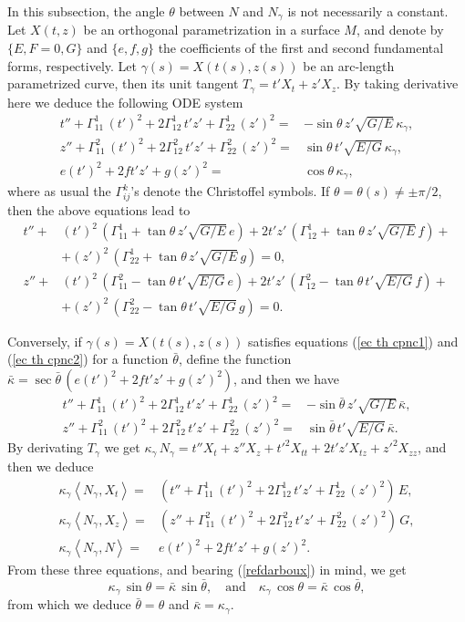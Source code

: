 \documentclass[11pt,a4paper]{article}
\def\<{\left<}
\def\>{\right>}
\def\g{\gamma}
\begin{document}
In this subsection, the angle $\theta$ between $N$ and $N_\g$ is not necessarily a constant. Let $X(t,z)$ be an orthogonal parametrization in a surface $M$, and denote by $\{E,F=0,G\}$ and $\{e,f,g\}$ the coefficients of the first and second fundamental forms, respectively.
Let $\g(s)=X(t(s),z(s))$ be an arc-length parametrized curve, then its unit tangent $T_\g=t'X_t+z'X_z$.
By taking derivative here we deduce the following ODE system
\begin{align*}
 t''+\Gamma_{11}^1\,(t')^2+2\Gamma_{12}^1\, t'z'+\Gamma_{22}^1\,(z')^2 = & -\sin\theta\,z'\sqrt{G/E}\,\kappa_\g, \\
 z''+\Gamma_{11}^2\,(t')^2+2\Gamma_{12}^2\, t'z'+\Gamma_{22}^2\,(z')^2 = & \sin\theta\,t'\sqrt{E/G}\,\kappa_\g,\\
 e(t')^2+2ft'z'+g(z')^2= & \cos\theta\,\kappa_\g,
\end{align*}
where as usual the $\Gamma_{ij}^k$'s denote the Christoffel symbols. If $\theta=\theta(s)\neq\pm\pi/2$, then the above equations lead to
\begin{align}
 t''+&(t')^2\,(\Gamma_{11}^1+\tan\theta\,z'\sqrt{G/E}\,e)+2 t'z'\,(\Gamma_{12}^1+\tan\theta\,z'\sqrt{G/E}\,f)+\nonumber\\
 &+(z')^2\,(\Gamma_{22}^1+\tan\theta\,z'\sqrt{G/E}\,g) =  0,\label{ec th cpnc1} \\
 z''+&(t')^2\,(\Gamma_{11}^2-\tan\theta\,t'\sqrt{E/G}\,e)+2 t'z'\,(\Gamma_{12}^2-\tan\theta\,t'\sqrt{E/G}\,f)+\nonumber\\
 &+(z')^2\,(\Gamma_{22}^2-\tan\theta\,t'\sqrt{E/G}\,g) = 0.\label{ec th cpnc2}
\end{align}

Conversely, if $\gamma(s)=X(t(s),z(s))$ satisfies equations (\ref{ec th cpnc1}) and (\ref{ec th cpnc2}) for a function $\bar{\theta}$, define the function $\bar{\kappa}=\sec\bar{\theta}\,(e(t')^2+2ft'z'+g(z')^2)$, and then we have
\begin{align*}
 t''+\Gamma_{11}^1\,(t')^2+2\Gamma_{12}^1\, t'z'+\Gamma_{22}^1\,(z')^2 = & -\sin\bar\theta\,z'\sqrt{G/E}\,\bar{\kappa},\\
 z''+\Gamma_{11}^2\,(t')^2+2\Gamma_{12}^2\, t'z'+\Gamma_{22}^2\,(z')^2 = & \sin\bar\theta\,t'\sqrt{E/G}\,\bar{\kappa}.
\end{align*}
By derivating $T_\g$ we get $\kappa_\gamma\,N_\gamma=t''X_t+z''X_z+t'^2X_{tt}+2t'z'X_{tz}+z'^2X_{zz}$, and then we deduce
\begin{align*}
  \kappa_\gamma\<N_\gamma,X_t\>= & (t''+\Gamma_{11}^1\,(t')^2+2\Gamma_{12}^1\, t'z'+\Gamma_{22}^1\,(z')^2)\,E, \\
  \kappa_\gamma\<N_\gamma,X_z\>=  & (z''+\Gamma_{11}^2\,(t')^2+2\Gamma_{12}^2\, t'z'+\Gamma_{22}^2\,(z')^2)\,G, \\
  \kappa_\gamma\<N_\gamma,N\>=  & e(t')^2+2ft'z'+g(z')^2.
\end{align*}
From these three equations, and bearing (\ref{refdarboux}) in mind, we get
\begin{equation*}
  \kappa_\gamma\,\sin{\theta} =\bar{\kappa}\,\sin\bar\theta, \quad\text{and}\quad  \kappa_\gamma\,\cos{\theta} =\bar{\kappa}\,\cos\bar\theta,
\end{equation*}
from which we deduce $\bar{\theta}=\theta$ and $\bar{\kappa}=\kappa_\gamma$.
\end{document}
